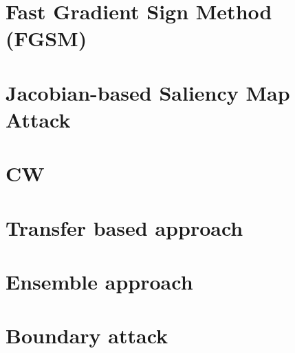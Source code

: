 \section{Fast Gradient Sign Method (FGSM)}
\label{sec:FGSM}



\section{Jacobian-based Saliency Map Attack}
\label{sec:JSMA}


 
\section{CW}
\label{sec:CW}



\section{Transfer based approach}
\label{sec:transfer-based}



\section{Ensemble approach} 
\label{sec:ensemble-approach}



\section{Boundary attack}
\label{boundary-attack}

